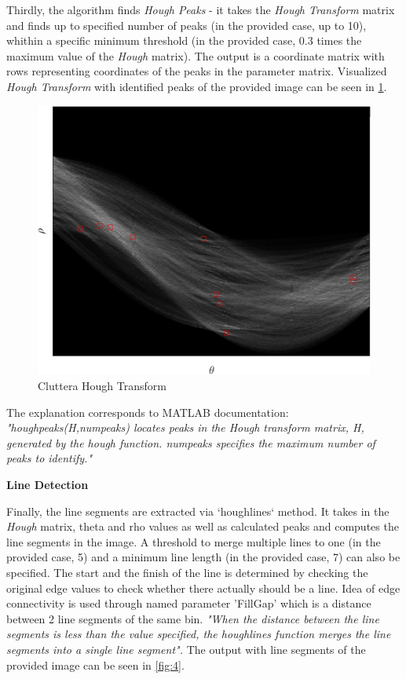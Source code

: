 \documentclass[lettersize,journal]{IEEEtran}
\begin{document}
\hfill

Thirdly, the algorithm finds \emph{Hough Peaks} - it takes the \emph{Hough Transform} matrix and finds up to specified number of peaks (in the provided case, up to 10), whithin a specific minimum threshold (in the provided case, 0.3 times the maximum value of the \emph{Hough} matrix). The output is a coordinate matrix with rows representing coordinates of the peaks in the parameter matrix. Visualized \emph{Hough Transform} with identified peaks of the provided image can be seen in \ref{fig:3}.

\begin{figure}[h]
    \centering
    \includegraphics[width=0.8\linewidth]{hough_transform_10}
    \caption{Cluttera Hough Transform}
    \label{fig:3}
\end{figure}

The explanation corresponds to MATLAB documentation: \emph{"houghpeaks(H,numpeaks) locates peaks in the Hough transform matrix, H, generated by the hough function. numpeaks specifies the maximum number of peaks to identify."}

\newpage

\noindent\textbf{Line Detection}

Finally, the line segments are extracted via `houghlines` method. It takes in the \emph{Hough} matrix, theta and rho values as well as calculated peaks and computes the line segments in the image. A threshold to merge multiple lines to one (in the provided case, 5) and a minimum line length (in the provided case, 7) can also be specified. The start and the finish of the line is determined by checking the original edge values to check whether there actually should be a line. Idea of edge connectivity is used through named parameter 'FillGap' which is a distance between 2 line segments of the same bin. \emph{"When the distance between the line segments is less than the value specified, the houghlines function merges the line segments into a single line segment".} The output with line segments of the provided image can be seen in \autoref{fig:4}.
\end{document}
